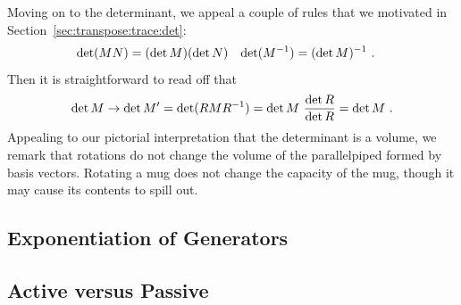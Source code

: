 \documentclass[12pt]{article}
\begin{document}
Moving on to the determinant, we appeal a couple of rules that we motivated in Section~\ref{sec:transpose:trace:det}: 
\begin{align}
    \det(MN) &= (\det M)(\det N)
    &
    \det(M^{-1} ) &= (\det M)^{-1}  \ .
\end{align}
Then it is straightforward to read off that
\begin{align}
    \det M \to \det M' = \det(RMR^{-1} ) = \det M\ \frac{\det R}{\det R} = \det M \ .
\end{align}
Appealing to our pictorial interpretation that the determinant is a volume, we remark that rotations do not change the volume of the parallelpiped formed by basis vectors. Rotating a mug does not change the capacity of the mug, though it may cause its contents to spill out. 



\subsection{Exponentiation of Generators}



\subsection{Active versus Passive}
\end{document}
